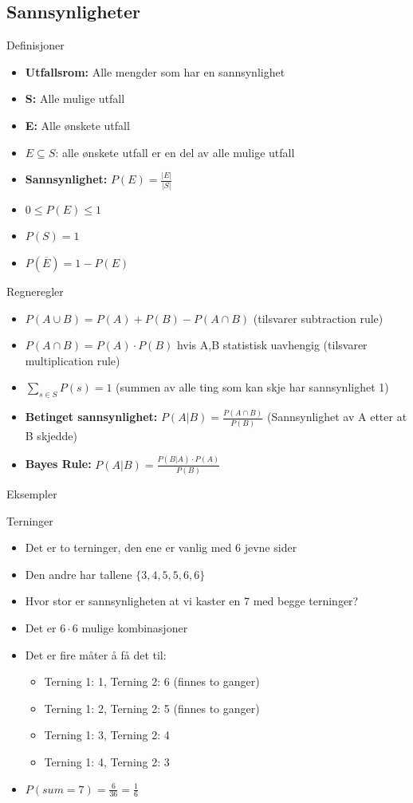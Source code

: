 \subsection{Sannsynligheter}
\begin{frame}{Definisjoner}
\begin{itemize}
\item \textbf{Utfallsrom: }Alle mengder som har en sannsynlighet
\item \textbf{S: }Alle mulige utfall
\item \textbf{E: }Alle ønskete utfall
\item $E \subseteq S$: alle ønskete utfall er en del av alle mulige utfall
\item \textbf{Sannsynlighet: }$P(E)=\frac{|E|}{|S|}$
\item $0 \leq P(E) \leq 1$
\item $P(S)=1$
\item $P(\overline{E})=1-P(E)$
\end{itemize}
\end{frame}

\begin{frame}{Regneregler}
\begin{itemize}
\item $P(A\cup B)=P(A)+P(B)-P(A\cap B)$ (tilsvarer subtraction rule)
\item $P(A\cap B)=P(A)\cdot P(B)$ hvis A,B statistisk uavhengig (tilsvarer multiplication rule)
\item $\sum_{s\in S} P(s) = 1 $ (summen av alle ting som kan skje har sannsynlighet 1)
\item \textbf{Betinget sannsynlighet: }$P(A|B)=\frac{P(A\cap B)}{P(B)}$ (Sannsynlighet av A etter at B skjedde)
\item \textbf{Bayes Rule: }$P(A|B)=\frac{P(B|A)\cdot P(A)}{P(B)}$
\end{itemize}
\end{frame}

\begin{frame}{Eksempler}
\begin{block}{Terninger}
\begin{itemize}
\item Det er to terninger, den ene er vanlig med 6 jevne sider
\item Den andre har tallene $\{3,4,5,5,6,6\}$
\item Hvor stor er sannsynligheten at vi kaster en 7 med begge terninger?
\item Det er $6\cdot 6$ mulige kombinasjoner
\item Det er fire måter å få det til:
\begin{itemize}
\item Terning 1: 1, Terning 2: 6 (finnes to ganger)
\item Terning 1: 2, Terning 2: 5 (finnes to ganger)
\item Terning 1: 3, Terning 2: 4
\item Terning 1: 4, Terning 2: 3
\end{itemize}
\item $P(sum=7)=\frac{6}{36}=\frac{1}{6}$
\end{itemize}
\end{block}
\end{frame}

